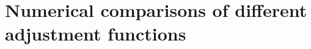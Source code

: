 \documentclass[11pt]{article}
\begin{document}






\section{Numerical comparisons of different adjustment functions} \label{app:comparison}
\end{document}
